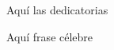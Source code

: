 \thispagestyle{empty}

\vspace*{7cm}

\begin{flushright}
  Aquí las dedicatorias  
\end{flushright}

\vspace*{3cm}

\begin{flushright}
  Aquí frase célebre
\end{flushright}

\emptyPage

